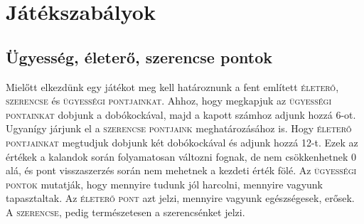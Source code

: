\documentclass[12pt,a4paper,oneside]{report}
\newcommand{\stat}{\textsc}
\begin{document}

    \section{Játékszabályok}
  
      \subsection{Ügyesség, életerő, szerencse pontok}
        Mielőtt elkezdünk egy játékot meg kell határoznunk a fent
        említett \stat{életerő}, \stat{szerencse} és \stat{ügyességi
        pontjainkat}. Ahhoz, hogy megkapjuk az \stat{ügyességi
        pontainkat} dobjunk a dobókockával, majd a kapott számhoz
        adjunk hozzá 6-ot. Ugyanígy járjunk el a \stat{szerencse
        pontjaink} meghatározásához is. Hogy \stat{életerő
        pontjainkat} megtudjuk dobjunk két dobókockával és adjunk
        hozzá 12-t. Ezek az értékek a kalandok során folyamatosan
        változni fognak, de nem csökkenhetnek 0 alá, és pont
        visszaszerzés során nem mehetnek a kezdeti érték fölé. Az
        \stat{ügyességi pontok} mutatják, hogy mennyire tudunk jól
        harcolni, mennyire vagyunk tapasztaltak. Az \stat{életerő
        pont} azt jelzi, mennyire vagyunk egészségesek, erősek. A
        \stat{szerencse}, pedig természetesen a szerencsénket jelzi.
    
\end{document}
